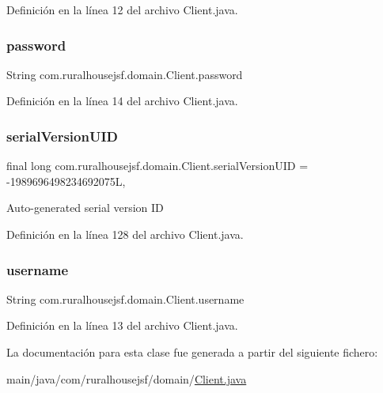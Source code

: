Definición en la línea 12 del archivo Client.\+java.

\mbox{\label{classcom_1_1ruralhousejsf_1_1domain_1_1_client_a1914bdf0282fd4a34b890a6fb775619e}} 
\subsubsection{\texorpdfstring{password}{password}}
{\footnotesize\ttfamily String com.\+ruralhousejsf.\+domain.\+Client.\+password\hspace{0.3cm}{\ttfamily [private]}}



Definición en la línea 14 del archivo Client.\+java.

\mbox{\label{classcom_1_1ruralhousejsf_1_1domain_1_1_client_a6ac812041b6242509f710f231010ad7f}} 
\subsubsection{\texorpdfstring{serialVersionUID}{serialVersionUID}}
{\footnotesize\ttfamily final long com.\+ruralhousejsf.\+domain.\+Client.\+serial\+Version\+U\+ID = -\/1989696498234692075L\hspace{0.3cm}{\ttfamily [static]}, {\ttfamily [private]}}

Auto-\/generated serial version ID 

Definición en la línea 128 del archivo Client.\+java.

\mbox{\label{classcom_1_1ruralhousejsf_1_1domain_1_1_client_a0d105bbb8e72c4a5b70ec43f59227882}} 
\subsubsection{\texorpdfstring{username}{username}}
{\footnotesize\ttfamily String com.\+ruralhousejsf.\+domain.\+Client.\+username\hspace{0.3cm}{\ttfamily [private]}}



Definición en la línea 13 del archivo Client.\+java.



La documentación para esta clase fue generada a partir del siguiente fichero\+:\begin{DoxyCompactItemize}
\item 
main/java/com/ruralhousejsf/domain/\mbox{\hyperlink{_client_8java}{Client.\+java}}\end{DoxyCompactItemize}
